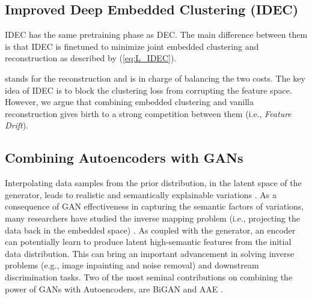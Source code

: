 \documentclass{article}
\begin{document}
\subsection{Improved Deep Embedded Clustering (IDEC)}
IDEC \cite{paper28} has the same pretraining phase as DEC. The main difference between them is that IDEC is finetuned to minimize joint embedded clustering and reconstruction as described by (\ref{eq:L_IDEC}).



 stands for the reconstruction and  is in charge of balancing the two costs. The key idea of IDEC is to block the clustering loss from corrupting the feature space. However, we argue that combining embedded clustering and vanilla reconstruction gives birth to a strong competition between them (i.e., \textit{Feature Drift}). 

\subsection{Combining Autoencoders with GANs}
Interpolating data samples from the prior distribution, in the latent space of the generator, leads to realistic and semantically explainable variations \cite{paper18,paper32}. As a consequence of GAN effectiveness in capturing the semantic factors of variations, many researchers have studied the inverse mapping problem (i.e., projecting the data back in the embedded space) \cite{paper7,paper10,paper6,paper8}. As coupled with the generator, an encoder can potentially learn to produce latent high-semantic features from the initial data distribution. This can bring an important advancement in solving inverse problems (e.g., image inpainting and noise removal) and downstream discrimination tasks. Two of the most seminal contributions on combining the power of GANs with Autoencoders, are BiGAN \cite{paper7} and AAE \cite{paper10}. 
\end{document}
